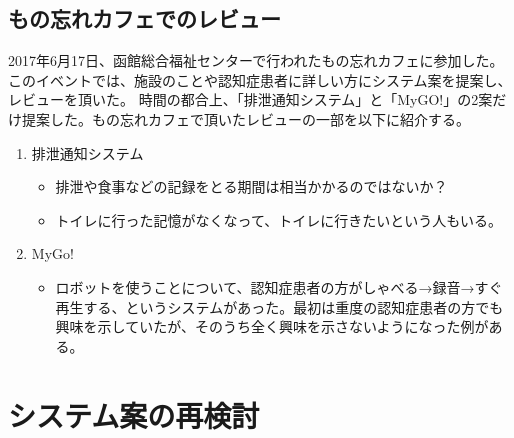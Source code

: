 \documentclass[../report]{subfiles}
\begin{document}
\subsection{もの忘れカフェでのレビュー}
2017年6月17日、函館総合福祉センターで行われたもの忘れカフェに参加した。
このイベントでは、施設のことや認知症患者に詳しい方にシステム案を提案し、レビューを頂いた。
時間の都合上、「排泄通知システム」と「MyGO!」の2案だけ提案した。もの忘れカフェで頂いたレビューの一部を以下に紹介する。
\begin{enumerate}
    \item 排泄通知システム
        \begin{itemize}
            \item 排泄や食事などの記録をとる期間は相当かかるのではないか？
            \item トイレに行った記憶がなくなって、トイレに行きたいという人もいる。
        \end{itemize}
    \item MyGo!
        \begin{itemize}
            \item ロボットを使うことについて、認知症患者の方がしゃべる→録音→すぐ再生する、というシステムがあった。最初は重度の認知症患者の方でも興味を示していたが、そのうち全く興味を示さないようになった例がある。
        \end{itemize}
\end{enumerate}


\section{システム案の再検討}
\end{document}
